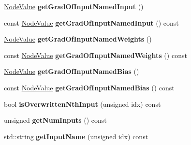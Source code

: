 \begin{DoxyCompactItemize}
\hyperlink{structglow_1_1_node_value}{Node\+Value} {\bfseries get\+Grad\+Of\+Input\+Named\+Input} ()
\item 
\mbox{\label{classglow_1_1_fully_connected_grad_node_a71c306f8fd2306cb5e6361a7839790a3}} 
const \hyperlink{structglow_1_1_node_value}{Node\+Value} {\bfseries get\+Grad\+Of\+Input\+Named\+Input} () const
\item 
\mbox{\label{classglow_1_1_fully_connected_grad_node_a474b7e4db33eeb6f01fa3c76fed9333a}} 
\hyperlink{structglow_1_1_node_value}{Node\+Value} {\bfseries get\+Grad\+Of\+Input\+Named\+Weights} ()
\item 
\mbox{\label{classglow_1_1_fully_connected_grad_node_aa707e739abb9606c1290f1a0e9c3b562}} 
const \hyperlink{structglow_1_1_node_value}{Node\+Value} {\bfseries get\+Grad\+Of\+Input\+Named\+Weights} () const
\item 
\mbox{\label{classglow_1_1_fully_connected_grad_node_a8017a8ef3982ce3fde70a208588d390f}} 
\hyperlink{structglow_1_1_node_value}{Node\+Value} {\bfseries get\+Grad\+Of\+Input\+Named\+Bias} ()
\item 
\mbox{\label{classglow_1_1_fully_connected_grad_node_ae00828b6e24b9e87213dba436b6499ba}} 
const \hyperlink{structglow_1_1_node_value}{Node\+Value} {\bfseries get\+Grad\+Of\+Input\+Named\+Bias} () const
\item 
\mbox{\label{classglow_1_1_fully_connected_grad_node_a53f1ee8840f44adcb265c24679933523}} 
bool {\bfseries is\+Overwritten\+Nth\+Input} (unsigned idx) const
\item 
\mbox{\label{classglow_1_1_fully_connected_grad_node_a60b923b27a0f3d77287470500eff8c0f}} 
unsigned {\bfseries get\+Num\+Inputs} () const
\item 
\mbox{\label{classglow_1_1_fully_connected_grad_node_a62981c2f21bf7a098a8f50836259bbc9}} 
std\+::string {\bfseries get\+Input\+Name} (unsigned idx) const

\end{DoxyCompactItemize}
